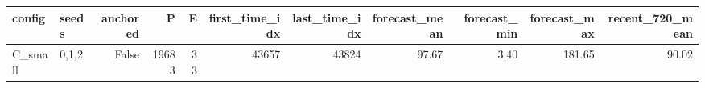 \begin{tabular}{llrrrrrrrrr}
\toprule
config & seeds & anchored & P & E & first\_time\_idx & last\_time\_idx & forecast\_mean & forecast\_min & forecast\_max & recent\_720\_mean \\
\midrule
C\_small & 0,1,2 & False & 19683 & 33 & 43657 & 43824 & 97.67 & 3.40 & 181.65 & 90.02 \\
\bottomrule
\end{tabular}

